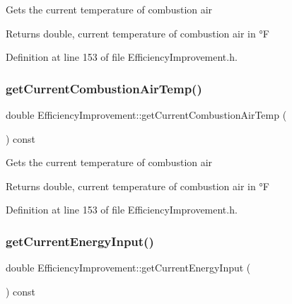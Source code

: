 Gets the current temperature of combustion air

\begin{DoxyReturn}{Returns}
double, current temperature of combustion air in °F 
\end{DoxyReturn}


Definition at line 153 of file Efficiency\+Improvement.\+h.

\mbox{\label{class_efficiency_improvement_aa2f9d297f3c31e249c7a8035fd5602f1}} 
\subsubsection{\texorpdfstring{get\+Current\+Combustion\+Air\+Temp()}{getCurrentCombustionAirTemp()}\hspace{0.1cm}{\footnotesize\ttfamily [3/3]}}
{\footnotesize\ttfamily double Efficiency\+Improvement\+::get\+Current\+Combustion\+Air\+Temp (\begin{DoxyParamCaption}{ }\end{DoxyParamCaption}) const\hspace{0.3cm}{\ttfamily [inline]}}

Gets the current temperature of combustion air

\begin{DoxyReturn}{Returns}
double, current temperature of combustion air in °F 
\end{DoxyReturn}


Definition at line 153 of file Efficiency\+Improvement.\+h.

\mbox{\label{class_efficiency_improvement_a8fcbdd3085f0a8b1120fb699522fcc05}} 
\subsubsection{\texorpdfstring{get\+Current\+Energy\+Input()}{getCurrentEnergyInput()}\hspace{0.1cm}{\footnotesize\ttfamily [1/3]}}
{\footnotesize\ttfamily double Efficiency\+Improvement\+::get\+Current\+Energy\+Input (\begin{DoxyParamCaption}{ }\end{DoxyParamCaption}) const\hspace{0.3cm}{\ttfamily [inline]}}

